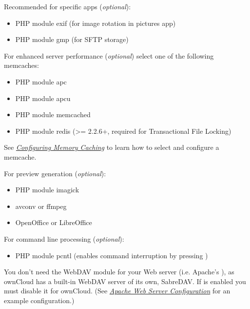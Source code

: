 \documentclass[letterpaper,10pt,english]{sphinxmanual}
\begin{document}
Recommended for specific apps (\emph{optional}):
\begin{itemize}
\item {} 
PHP module exif (for image rotation in pictures app)

\item {} 
PHP module gmp (for SFTP storage)

\end{itemize}

For enhanced server performance (\emph{optional}) select one of the following
memcaches:
\begin{itemize}
\item {} 
PHP module apc

\item {} 
PHP module apcu

\item {} 
PHP module memcached

\item {} 
PHP module redis (\textgreater{}= 2.2.6+, required for Transactional File Locking)

\end{itemize}

See {\hyperref[configuration_server/caching_configuration::doc]{\emph{\emph{Configuring Memory Caching}}}} to learn how to select
and configure a memcache.

For preview generation (\emph{optional}):
\begin{itemize}
\item {} 
PHP module imagick

\item {} 
avconv or ffmpeg

\item {} 
OpenOffice or LibreOffice

\end{itemize}

For command line processing (\emph{optional}):
\begin{itemize}
\item {} 
PHP module pcntl (enables command interruption by pressing )

\end{itemize}

You don’t need the WebDAV module for your Web server (i.e. Apache’s
), as ownCloud has a built-in WebDAV server of its own, SabreDAV.
If  is enabled you must disable it for ownCloud. (See
{\hyperref[installation/source_installation:apache\string-configuration\string-label]{\emph{Apache Web Server Configuration}}} for an example configuration.)
\end{document}
